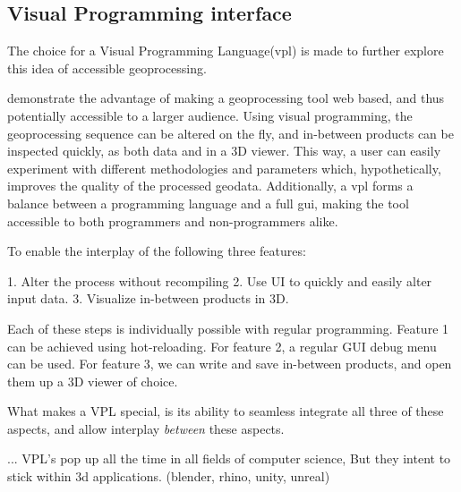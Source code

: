 




\subsection{Visual Programming interface}

The choice for a Visual Programming Language(vpl) is made to further explore this idea of accessible geoprocessing. 

demonstrate the advantage of making a geoprocessing tool web based, and thus potentially accessible to a larger audience. 
Using visual programming, the geoprocessing sequence can be altered on the fly, and in-between products can be inspected quickly, as both data and in a 3D viewer. 
This way, a user can easily experiment with different methodologies and parameters which, hypothetically, improves the quality of the processed geodata.
Additionally, a vpl forms a balance between a programming language and a full gui, making the tool accessible to both programmers and non-programmers alike.

To enable the interplay of the following three features: 

1. Alter the process without recompiling
2. Use UI to quickly and easily alter input data.
3. Visualize in-between products in 3D. 

Each of these steps is individually possible with regular programming. Feature 1 can be achieved using hot-reloading. For feature 2, a regular GUI debug menu can be used. For feature 3, we can write and save in-between products, and open them up a 3D viewer of choice. 

What makes a VPL special, is its ability to seamless integrate all three of these aspects, and allow interplay \emph{between} these aspects.

...
VPL's pop up all the time in all fields of computer science, But they intent to stick within 3d applications. (blender, rhino, unity, unreal)

